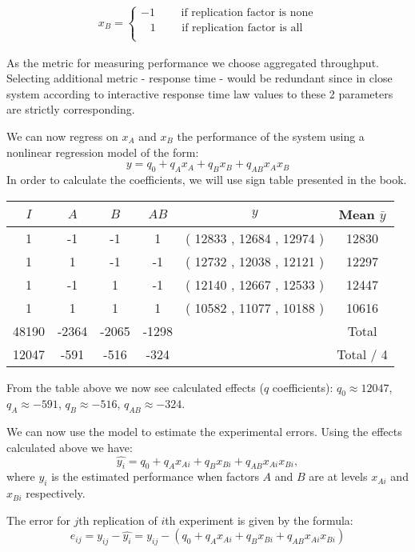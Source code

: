 \documentclass[11pt]{article}
\begin{document}
\begin{gather*}
x_B = 
\begin{cases}
-1 \qquad \text{ if replication factor is none} \\ 
\;\;\;1 \qquad \text{ if replication factor is all} \\ 
\end{cases}
\end{gather*}

As the metric for measuring performance we choose aggregated throughput. Selecting additional metric - response time - would be redundant since in close system according to interactive response time law values to these 2 parameters are strictly corresponding.

We can now regress on $x_A$ and $x_B$ the performance of the system using a nonlinear regression model of the form:
$$y = q_0 + q_Ax_A + q_Bx_B + q_{AB}x_Ax_B$$
In order to calculate the coefficients, we will use sign table presented in the book.
\medskip

\begin{center}
\begin{tabular}{|c|c|c|c|c|c|}
\hline $I$ & $A$ & $B$ & $AB$ & $y$ &Mean $\bar{y}$ \\
\hline	1	&	-1	&	-1	&	1	&	(	12833	,	12684	,	12974	) &	12830	\\
\hline	1	&	1	&	-1	&	-1	&	(	12732	,	12038	,	12121	) &	12297	\\
\hline	1	&	-1	&	1	&	-1	&	(	12140	,	12667	,	12533	) &	12447	\\
\hline	1	&	1	&	1	&	1	&	(	10582	,	11077	,	10188	) &	10616	\\
\hline	48190	&	-2364	&	-2065	&	-1298	&							&	Total	\\
\hline	12047	&	-591	&	-516	&	-324	&							&	Total / 4	\\
\hline
\end{tabular}
\end{center}
\medskip

From the table above we now see calculated effects ($q$ coefficients): $q_0 \approx 12047$, $q_A \approx -591$, $q_B \approx -516$, $q_{AB} \approx -324$.

We can now use the model to estimate the experimental errors. Using the effects calculated above we have:
$$\hat{y_i} =  q_0 + q_Ax_{Ai} + q_Bx_{Bi} + q_{AB}x_{Ai}x_{Bi},$$
where $\hat{y_i}$ is the estimated performance when factors $A$ and $B$ are at levels $x_{Ai}$ and $x_{Bi}$ respectively.

The error for $j$th replication of $i$th experiment is given by the formula:
$$e_{ij} = y_{ij} - \hat{y_i} = y_{ij} -  (q_0 + q_Ax_{Ai} + q_Bx_{Bi} + q_{AB}x_{Ai}x_{Bi})$$
\end{document}
